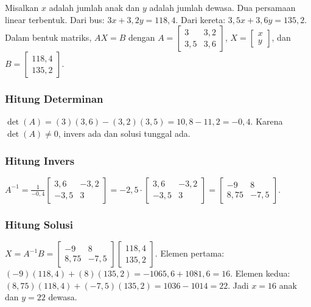 \documentclass[11pt,a4paper]{article}
\begin{document}
Misalkan $x$ adalah jumlah anak dan $y$ adalah jumlah dewasa. Dua persamaan linear terbentuk. Dari bus: $3x+3{,}2y=118{,}4$. Dari kereta: $3{,}5x+3{,}6y=135{,}2$. Dalam bentuk matriks, $AX=B$ dengan $A=\begin{bmatrix}3&3{,}2\\3{,}5&3{,}6\end{bmatrix}$, $X=\begin{bmatrix}x\\y\end{bmatrix}$, dan $B=\begin{bmatrix}118{,}4\\135{,}2\end{bmatrix}$.

\subsubsection{Hitung Determinan}

$\det(A)=(3)(3{,}6)-(3{,}2)(3{,}5)=10{,}8-11{,}2=-0{,}4$. Karena $\det(A) \ne 0$, invers ada dan solusi tunggal ada.

\subsubsection{Hitung Invers}

$A^{-1}=\frac{1}{-0{,}4}\begin{bmatrix}3{,}6&-3{,}2\\-3{,}5&3\end{bmatrix}=-2{,}5 \cdot \begin{bmatrix}3{,}6&-3{,}2\\-3{,}5&3\end{bmatrix}=\begin{bmatrix}-9&8\\8{,}75&-7{,}5\end{bmatrix}$.

\subsubsection{Hitung Solusi}

$X=A^{-1}B=\begin{bmatrix}-9&8\\8{,}75&-7{,}5\end{bmatrix}\begin{bmatrix}118{,}4\\135{,}2\end{bmatrix}$. Elemen pertama: $(-9)(118{,}4)+(8)(135{,}2)=-1065{,}6+1081{,}6=16$. Elemen kedua: $(8{,}75)(118{,}4)+(-7{,}5)(135{,}2)=1036-1014=22$. Jadi $x=16$ anak dan $y=22$ dewasa.
\end{document}
